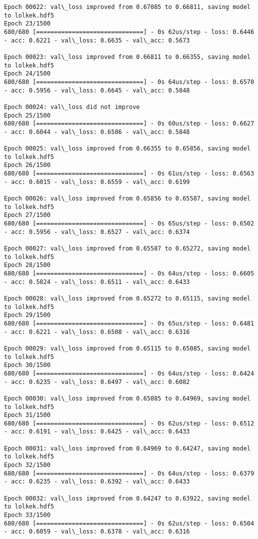 \documentclass[11pt]{article}
\begin{document}
\begin{Verbatim}[commandchars=\\\{\}]
Epoch 00022: val\_loss improved from 0.67085 to 0.66811, saving model to lolkek.hdf5
Epoch 23/1500
680/680 [==============================] - 0s 62us/step - loss: 0.6446 - acc: 0.6221 - val\_loss: 0.6635 - val\_acc: 0.5673

Epoch 00023: val\_loss improved from 0.66811 to 0.66355, saving model to lolkek.hdf5
Epoch 24/1500
680/680 [==============================] - 0s 64us/step - loss: 0.6570 - acc: 0.5956 - val\_loss: 0.6645 - val\_acc: 0.5848

Epoch 00024: val\_loss did not improve
Epoch 25/1500
680/680 [==============================] - 0s 60us/step - loss: 0.6627 - acc: 0.6044 - val\_loss: 0.6586 - val\_acc: 0.5848

Epoch 00025: val\_loss improved from 0.66355 to 0.65856, saving model to lolkek.hdf5
Epoch 26/1500
680/680 [==============================] - 0s 61us/step - loss: 0.6563 - acc: 0.6015 - val\_loss: 0.6559 - val\_acc: 0.6199

Epoch 00026: val\_loss improved from 0.65856 to 0.65587, saving model to lolkek.hdf5
Epoch 27/1500
680/680 [==============================] - 0s 65us/step - loss: 0.6502 - acc: 0.5956 - val\_loss: 0.6527 - val\_acc: 0.6374

Epoch 00027: val\_loss improved from 0.65587 to 0.65272, saving model to lolkek.hdf5
Epoch 28/1500
680/680 [==============================] - 0s 64us/step - loss: 0.6605 - acc: 0.5824 - val\_loss: 0.6511 - val\_acc: 0.6433

Epoch 00028: val\_loss improved from 0.65272 to 0.65115, saving model to lolkek.hdf5
Epoch 29/1500
680/680 [==============================] - 0s 65us/step - loss: 0.6481 - acc: 0.6221 - val\_loss: 0.6508 - val\_acc: 0.6316

Epoch 00029: val\_loss improved from 0.65115 to 0.65085, saving model to lolkek.hdf5
Epoch 30/1500
680/680 [==============================] - 0s 64us/step - loss: 0.6424 - acc: 0.6235 - val\_loss: 0.6497 - val\_acc: 0.6082

Epoch 00030: val\_loss improved from 0.65085 to 0.64969, saving model to lolkek.hdf5
Epoch 31/1500
680/680 [==============================] - 0s 62us/step - loss: 0.6512 - acc: 0.6191 - val\_loss: 0.6425 - val\_acc: 0.6433

Epoch 00031: val\_loss improved from 0.64969 to 0.64247, saving model to lolkek.hdf5
Epoch 32/1500
680/680 [==============================] - 0s 64us/step - loss: 0.6379 - acc: 0.6235 - val\_loss: 0.6392 - val\_acc: 0.6433

Epoch 00032: val\_loss improved from 0.64247 to 0.63922, saving model to lolkek.hdf5
Epoch 33/1500
680/680 [==============================] - 0s 62us/step - loss: 0.6504 - acc: 0.6059 - val\_loss: 0.6378 - val\_acc: 0.6316


\end{Verbatim}
\end{document}
